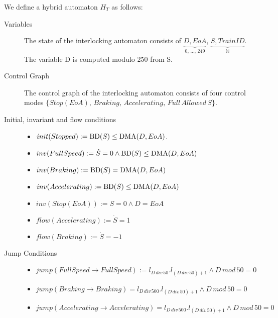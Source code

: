 \begin{mydef}

We define a hybrid automaton $H_{T}$ as follows:
\begin{description}
\item[Variables] The state of the interlocking automaton consists of $\underbrace{D, EoA}_\text{0, \ldots , 249}$, \newline $\underbrace{S, TrainID}_{\mathbb{N}}$. The variable D is computed modulo 250 from S.

\item[Control Graph] The control graph of the interlocking automaton consists of four control modes $\{Stop (EoA), \, Braking, \, Accelerating, \, Full \, Allowed \, S \}$.

\item[Initial, invariant and flow conditions] \hspace*{0mm}
	\begin{itemize}
	\item $init(Stopped) :=   \mathrm{BD}(S) \leq \mathrm{DMA}(D,EoA)  $.

	\item $inv(Full Speed) :=   \dot{S} = 0 \wedge \mathrm{BD}(S) \leq \mathrm{DMA}(D,EoA)$ 

	\item $inv(Braking)  :=  \mathrm{BD}(S) = \mathrm{DMA}(D,EoA)$
         \item $inv(Accelerating) := \mathrm{BD}(S) \leq \mathrm{DMA}(D,EoA)$

	\item $inv(Stop (EoA)) := S = 0 \wedge D = EoA$ 
             
	\item $flow(Accelerating):= \dot{S} = 1$ 
	
	\item $flow(Braking) := \dot{S} = -1$
 
	\end{itemize}

\item[Jump Conditions] \hspace*{0mm}

	\begin{itemize}
	\item $jump(Full Speed \to Full Speed) := l_{D \, div \, 50}.l_{(D \, div \, 50) +1} \wedge D \, mod \, 50 = 0$
\item $jump(Braking \to Braking) = l_{D \, div \, 500}.l_{(D \, div \, 50) +1} \wedge D \, mod \, 50 = 0$
\item $jump(Accelerating \to Accelerating) = l_{D \, div \, 500}.l_{(D \, div \, 50) +1} \wedge D \, mod \, 50 = 0$


\end{itemize}
\end{description}
\end{mydef}
